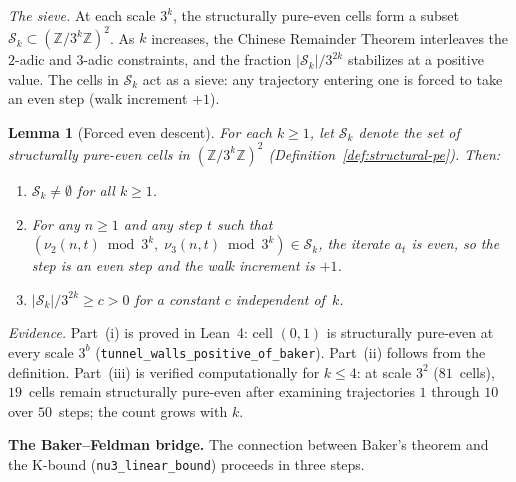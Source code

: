 \documentclass[manuscript]{aomart}
\newcommand{\Z}{\mathbb{Z}}
\theoremstyle{plain}
\newtheorem{lemma}[theorem]{Lemma}
\theoremstyle{definition}
\theoremstyle{remark}
\numberwithin{equation}{section}
\begin{document}
\medskip\noindent
\emph{The sieve.}\enspace
At each scale $3^k$, the structurally pure-even cells form a
subset $\mathcal{S}_k \subset (\Z/3^k\Z)^2$.  As $k$ increases,
the Chinese Remainder Theorem interleaves the $2$-adic and $3$-adic
constraints, and the fraction $|\mathcal{S}_k| / 3^{2k}$ stabilizes
at a positive value.  The cells in $\mathcal{S}_k$ act as a sieve:
any trajectory entering one is forced to take an even step
(walk increment $+1$).

\begin{lemma}[Forced even descent]\label{lem:forced-descent}
For each $k \ge 1$, let $\mathcal{S}_k$ denote the set of
structurally pure-even cells in $(\Z/3^k\Z)^2$
(Definition~\textup{\ref{def:structural-pe}}).  Then:
\begin{enumerate}
\item[\textup{(i)}] $\mathcal{S}_k \neq \emptyset$ for all $k \ge 1$.
\item[\textup{(ii)}] For any $n \ge 1$ and any step $t$ such that
  $(\nu_2(n,t) \bmod 3^k, \; \nu_3(n,t) \bmod 3^k) \in \mathcal{S}_k$,
  the iterate $a_t$ is even, so the step is an even step and the
  walk increment is $+1$.
\item[\textup{(iii)}] $|\mathcal{S}_k| / 3^{2k} \ge c > 0$ for a
  constant $c$ independent of~$k$.
\end{enumerate}
\end{lemma}

\noindent\emph{Evidence.}\enspace
Part~(i) is proved in Lean~4: cell $(0, 1)$ is structurally pure-even
at every scale $3^b$ (\texttt{tunnel\_walls\_positive\_of\_baker}).
Part~(ii) follows from the definition.  Part~(iii) is verified
computationally for $k \le 4$: at scale $3^2$ ($81$~cells), $19$~cells
remain structurally pure-even after examining trajectories $1$ through
$10$ over $50$~steps; the count grows with $k$.

\medskip\noindent
\textbf{The Baker--Feldman bridge.}\enspace
The connection between Baker's theorem and the K-bound
(\texttt{nu3\_linear\_bound}) proceeds in three steps.
\end{document}
